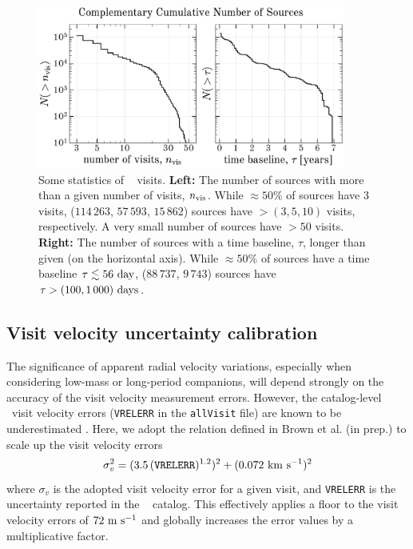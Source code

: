 \documentclass[modern]{aastex63}
\begin{document}
\begin{figure}[!t]
\begin{center}
\includegraphics[width=0.9\textwidth]{visitstats.pdf}
\end{center}
\caption{%
Some statistics of \apogee\  visits.
\textbf{Left:} The number of sources with more than a given number of visits,
$n_{\rm vis}$.
While $\approx$$50\%$ of sources have 3 visits, ($114\,263$, $57\,593$,
$15\,862$) sources have $> (3, 5, 10)$ visits, respectively.
A very small number of sources have $>50$ visits.
\textbf{Right:} The number of sources with a time baseline, $\tau$, longer than
given (on the horizontal axis).
While $\approx$$50\%$ of sources have a time baseline $\tau \lesssim 56~{\rm
day}$, ($88\,737$, $9\,743$) sources have $\tau > (100, 1\,000)~{\rm days}$.
\label{fig:visitstats}
}
\end{figure}


\subsection{Visit velocity uncertainty calibration} \label{sec:visitcalib}

The significance of apparent radial velocity variations, especially when
considering low-mass or long-period companions, will depend strongly on the
accuracy of the visit velocity measurement errors.
However, the catalog-level \apogee\ visit velocity errors (\texttt{VRELERR} in
the \texttt{allVisit} file) are known to be underestimated
\citep[e.g.,][]{Cottaar:2014}.
Here, we adopt the relation defined in Brown et al. (in prep.) to scale up the
visit velocity errors
\begin{equation}
    \sigma_v^2 = (3.5\,(\texttt{VRELERR})^{1.2})^2 + (0.072~\kms)^2 \label{eq:verr}
\end{equation}
where $\sigma_v$ is the adopted visit velocity error for a given visit, and
\texttt{VRELERR} is the uncertainty reported in the \apogee\  catalog.
This effectively applies a floor to the visit velocity errors of $72~\mathrm{m}~\mathrm{s}^{-1}$ and
globally increases the error values by a multiplicative factor.
\end{document}
